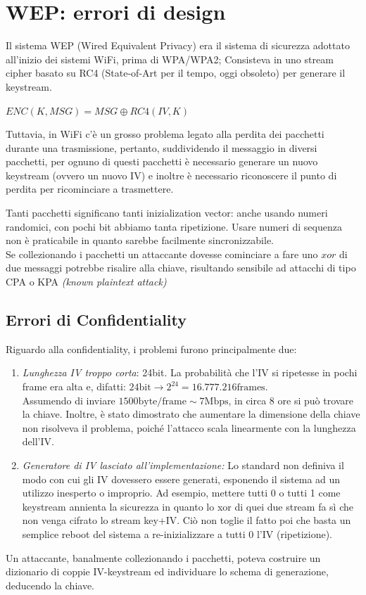 \section{WEP: errori di design}
Il sistema WEP (Wired Equivalent Privacy) era il sistema di sicurezza adottato all'inizio dei sistemi WiFi, prima di WPA/WPA2; Consisteva in uno stream cipher basato su RC4 (State-of-Art per il tempo, oggi obsoleto) per generare il keystream. 
\begin{center}
    $ENC(K,MSG)=MSG\oplus{RC4(IV,K)}$
\end{center}
Tuttavia, in WiFi c'è un grosso problema legato alla perdita dei pacchetti durante una trasmissione, pertanto, suddividendo il messaggio in diversi pacchetti, per ognuno di questi pacchetti è necessario generare un nuovo keystream (ovvero un nuovo IV) e inoltre è necessario riconoscere il punto di perdita per ricominciare a trasmettere.\\
\begin{remark}
Tanti pacchetti significano tanti inizialization vector: anche usando numeri randomici, con pochi bit abbiamo tanta ripetizione. Usare numeri di sequenza non è praticabile in quanto sarebbe facilmente sincronizzabile.\\
Se collezionando i pacchetti un attaccante dovesse cominciare a fare uno $xor$ di due messaggi potrebbe risalire alla chiave, risultando sensibile ad attacchi di tipo CPA o KPA \textit{(known plaintext attack)}
\end{remark}\pagebreak
\subsection{Errori di Confidentiality}
Riguardo alla confidentiality, i problemi furono principalmente due:
\begin{enumerate}
\item \textit{Lunghezza IV troppo corta}: 24bit. La probabilità che l'IV si ripetesse in pochi frame era alta e, difatti:
$24\text{bit}\rightarrow{2^{24}=16.777.216} \text{frames}$.\\Assumendo di inviare $1500\text{byte/frame}\sim7\text{Mbps}$, in circa 8 ore si può trovare la chiave. Inoltre, è stato dimostrato che aumentare la dimensione della chiave non risolveva il problema, poiché l'attacco scala linearmente con la lunghezza dell'IV.
\item \textit{Generatore di IV lasciato all'implementazione:} Lo standard non definiva il modo con cui gli IV dovessero essere generati, esponendo il sistema ad un utilizzo inesperto o improprio. Ad esempio, mettere tutti 0 o tutti 1 come keystream annienta la sicurezza in quanto lo xor di quei due stream fa sì che non venga cifrato lo stream key+IV. Ciò non toglie il fatto poi che basta un semplice reboot del sistema a re-inizializzare a tutti 0 l’IV (ripetizione).
\end{enumerate}
Un attaccante, banalmente collezionando i pacchetti, poteva costruire un dizionario di coppie IV-keystream ed individuare lo schema di generazione, deducendo la chiave.
